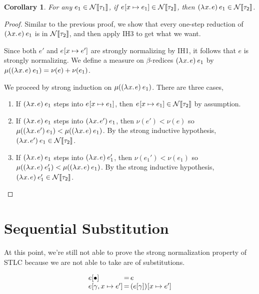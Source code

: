 \documentclass{article}
\newtheorem{corollary}{Corollary}
\theoremstyle{definition}
\begin{document}
\begin{corollary}\label{cor:something}
  For any $e_{1} \in \mathcal{N}\llbracket\tau_{1}\rrbracket$, if $e\mkern1mu[x \mapsto e_{1}] \in \mathcal{N}\llbracket\tau_{2}\rrbracket$, then $(\lambda\mkern1mux.\mkern2mue)\mkern4mue_{1} \in \mathcal{N}\llbracket\tau_{2}\rrbracket$.
\end{corollary}
\begin{proof}
  Similar to the previous proof, we show that every one-step reduction of $(\lambda\mkern1mux.\mkern2mue)\mkern4mue_{1}$ is in $\mathcal{N}\llbracket\tau_{2}\rrbracket$, and then apply IH3 to get what we want.
  
  Since both $e'$ and $e\mkern1mu[x \mapsto e']$ are strongly normalizing by IH1, it follows that $e$ is strongly normalizing.
  We define a measure on $\beta$-redices $(\lambda\mkern1mux.\mkern2mue)\mkern4mue_{1}$ by $\mu((\lambda\mkern1mux.\mkern2mue)\mkern4mue_{1}) = \nu(e) + \nu(e_{1})$.
  
  We proceed by strong induction on $\mu((\lambda\mkern1mux.\mkern2mue)\mkern4mue_{1})$.
  There are three cases,
  \begin{enumerate}
  \item If $(\lambda\mkern1mux.\mkern2mue)\mkern4mue_{1}$ steps into $e\mkern1mu[x \mapsto e_{1}]$, then $e\mkern1mu[x \mapsto e_{1}] \in \mathcal{N}\llbracket\tau_{2}\rrbracket$ by assumption.
  \item If $(\lambda\mkern1mux.\mkern2mue)\mkern4mue_{1}$ steps into $(\lambda\mkern1mux.\mkern2mue')\mkern4mue_{1}$, then $\nu(e') < \nu(e)$ so $\mu((\lambda\mkern1mux.\mkern2mue')\mkern4mue_{1}) < \mu((\lambda\mkern1mux.\mkern2mue)\mkern4mue_{1})$.
    By the strong inductive hypothesis, $(\lambda\mkern1mux.\mkern2mue')\mkern4mue_{1} \in \mathcal{N}\llbracket\tau_{2}\rrbracket$.
  \item If $(\lambda\mkern1mux.\mkern2mue)\mkern4mue_{1}$ steps into $(\lambda\mkern1mux.\mkern2mue)\mkern4mue_{1}'$, then $\nu(e_{1}') < \nu(e_{1})$ so $\mu((\lambda\mkern1mux.\mkern2mue)\mkern4mue_{1}') < \mu((\lambda\mkern1mux.\mkern2mue)\mkern4mue_{1})$.
    By the strong inductive hypothesis, $(\lambda\mkern1mux.\mkern2mue)\mkern4mue_{1}' \in \mathcal{N}\llbracket\tau_{2}\rrbracket$.
  \end{enumerate}
\end{proof}

\section*{Sequential Substitution}

At this point, we're still not able to prove the strong normalization property of STLC because we are not able to take are of substitutions.

\begin{syntax}
   \alternative{\bullet} 
\end{syntax}

\[
  \begin{array}{l@{\,=\,}l}
    e[\bullet] & e\\
    e[\gamma, x \mapsto e'] & \Subst{(e[\gamma])}{x}{e'}
  \end{array}
\]
\end{document}
